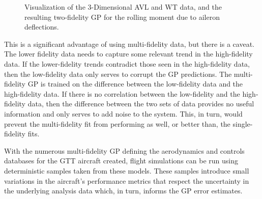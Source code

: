 \begin{figure}
    \centering
    \begin{subfigure}[\label{subfig:gtt_2f_ctrl_surf}3-Dimensional function in $\alpha$, $\beta$, and $\delta_a$] {
        \texttt{[image: code/image\_gen/gmatt/3f/images/gps/CRMAIL.png]} }
    \end{subfigure}
    \hfill
    \begin{subfigure}[\label{subfig:gtt_2f_ctrl_beta}Variation in $\beta$ at $\alpha=8^\circ$]{
        \texttt{[image: code/image\_gen/gmatt/3f/images/gps/CRMAIL\_alpha=8.png]}
    }
    \end{subfigure}
    \hfill
    \begin{subfigure}[\label{subfig:gtt_2f_ctrl_alpha}Variation in $\alpha$ at $\beta=4^\circ$]{
        \texttt{[image: code/image\_gen/gmatt/3f/images/gps/CRMAIL\_beta=4.png]} 
    }
    \end{subfigure}
    \hfill
    \begin{subfigure}[\label{subfig:gtt_2f_ctrl_defl}Variation in $\delta_a$ at $\alpha = 8^\circ$ and $\beta=4^\circ$]{
        \texttt{[image: code/image\_gen/gmatt/3f/images/gps/CRMAIL\_alpha=8\_beta=4.png]} 
    }
    \end{subfigure}
    \caption{Visualization of the 3-Dimensional AVL and WT data, and the resulting two-fidelity GP for the rolling moment due to aileron deflections. \label{fig:gtt_2f_ctrl_gps}}
\end{figure}

This is a significant advantage of using multi-fidelity data, but there is a caveat.
The lower fidelity data needs to capture some relevant trend in the high-fidelity data. 
If the lower-fidelity trends contradict those seen in the high-fidelity data, then the low-fidelity data only serves to corrupt the GP predictions. 
The multi-fidelity GP is trained on the difference between the low-fidelity data and the high-fidelity data. 
If there is no correlation between the low-fidelity and the high-fidelity data, then the difference between the two sets of data provides no useful information and only serves to add noise to the system. 
This, in turn, would prevent the multi-fidelity fit from performing as well, or better than, the single-fidelity fits. 

With the numerous multi-fidelity GP defining the aerodynamics and controls databases for the GTT aircraft created, flight simulations can be run using deterministic samples taken from these models.
These samples introduce small variations in the aircraft's performance metrics that respect the uncertainty in the underlying analysis data which, in turn, informs the GP error estimates.